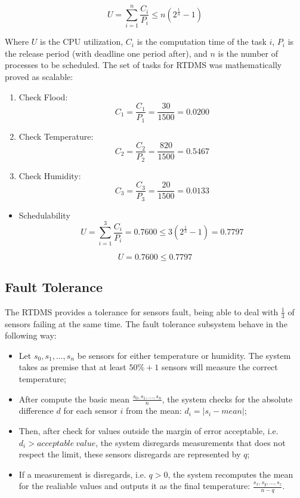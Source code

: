 \documentclass[12pt]{article}
\begin{document}
\[ \displaystyle U = \sum_{i=1}^{n}\frac{C_i}{P_i} \leq n(2^\frac{1}{n} - 1) \]

Where \(U\) is the CPU utilization, \(C_i\) is the computation time of the task \(i\), \(P_i\) is the release period (with deadline one period after),
and \(n\) is the number of processes to be scheduled. The set of tasks for RTDMS was mathematically proved as scalable:

\begin{enumerate}
 \item Check Flood: \[ C_1 = \frac{C_1}{P_1} = \frac{30}{1500} = 0.0200 \]
 \item Check Temperature: \[ C_2 = \frac{C_2}{P_2} = \frac{820}{1500} = 0.5467 \]
 \item Check Humidity: \[ C_3 = \frac{C_3}{P_3} = \frac{20}{1500} = 0.0133 \]
\end{enumerate}
\begin{itemize}
 \item Schedulability \[ U = \sum_{i=1}^{3}\frac{C_i}{P_i} = 0.7600 \leq 3(2^\frac{1}{3} - 1) = 0.7797 \]
\end{itemize}

\[ U = 0.7600 \leq 0.7797 \]

\subsection{Fault Tolerance}

The RTDMS provides a tolerance for sensors fault, being able to deal with \(\frac{1}{3}\) of sensors failing at the same
time. The fault tolerance subsystem behave in the following way:
\begin{itemize}
 \item Let \(s_0, s_1, ... , s_n\) be sensors for either temperature or humidity. The system takes as premise that at 
 least \(50\% + 1\) sensors will measure the correct temperature;
 \item After compute the basic mean \(\frac{s_0, s_1, ... , s_n}{n}\), the system checks for the absolute difference \(d\) for
 each sensor \(i\) from the mean: \(d_i = |s_i - mean|\);
 \item Then, after check for values outside the margin of error acceptable, i.e. \(d_i > acceptable\ value\), the system 
 disregards measurements that does not respect the limit, these sensors disregards are represented by \(q\);
 \item If a measurement is disregards, i.e. \(q > 0\), the system recomputes the mean for the realiable values and outputs it as the final
 temperature: \(\frac{s_x, s_y, ... , s_z}{n - q}\).
\end{itemize}
\end{document}
